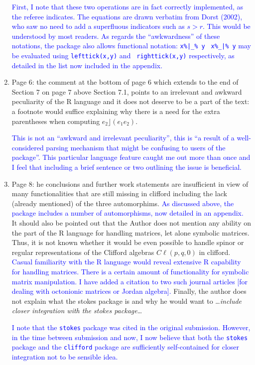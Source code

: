 \documentclass{article}
\newcommand{\cliff}[1]{\ensuremath{C\ell\left(#1\right)}}
\begin{document}
\begin{enumerate}
\textcolor{blue}{First, I note that these two operations are in fact
  correctly implemented, as the referee indicates.  The equations are
  drawn verbatim from Dorst (2002), who saw no need to add a
  superfluous indicators such as $s>r$. This would be understood by
  most readers.  As regards the ``awkwardness'' of these notations,
  the package also allows functional notation: {\tt x\%|\_\% y} {\tt
    x\%\_|\% y} may be evaluated using {\tt lefttick(x,y)} and {\tt
    righttick(x,y)} respectively, as detailed in the list now included
  in the appendix.}

\item Page 6: the comment at the bottom of page 6 which extends to the
  end of Section 7 on page 7 above Section 7.1, points to an
  irrelevant and awkward peculiarity of the R language and it does not
  deserve to be a part of the text: a footnote would suffice
  explaining why there is a need for the extra parentheses when
  computing $e_2\rfloor (e_1e_2)$.

  \textcolor{blue}{This is not an ``awkward and irrelevant
    peculiarity'', this is ``a result of a well-considered parsing
    mechanism that might be confusing to users of the package''.  This
    particular language feature caught me out more than once and I
    feel that including a brief sentence or two outlining the issue is
    beneficial.}


\item Page 8: he conclusions and further work statements are
  insufficient in view of many functionalities that are still missing
  in clifford including the lack (already mentioned) of the three
  automorphims. \textcolor{blue}{As discussed above, the package
    includes a number of automorphisms, now detailed in an appendix.}
  It should also be pointed out that the Author does not mention any
  ability on the part of the R language for handling matrices, let
  alone symbolic matrices.  Thus, it is not known whether it would be
  even possible to handle spinor or regular representations of the
  Clifford algebras \cliff{p, q, 0} in clifford.
  \textcolor{blue}{Casual familiarity with the R language would reveal
    extensive R capability for handling matrices.  There is a certain
    amount of functionality for symbolic matrix manipulation.  I have
    added a citation to two such journal articles [for dealing with
      octonionic matrices or Jordan algebra].}  Finally, the author
  does not explain what the stokes package is and why he would want to
  \ldots{\em include closer integration with the stokes package}\ldots

  \textcolor{blue}{I note that the {\tt stokes} package was cited in
    the original submission.  However, in the time between submission
    and now, I now believe that both the {\tt stokes} package and the
    {\tt clifford} package are sufficiently self-contained for closer
    integration not to be sensible idea.}


\end{enumerate}
\end{document}
